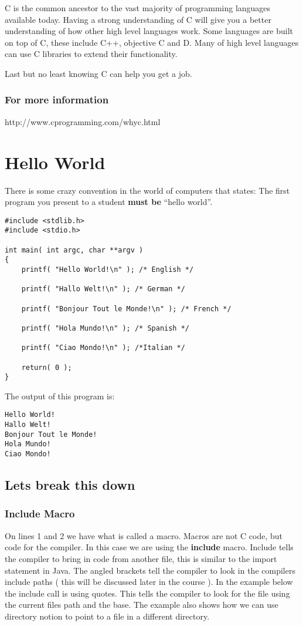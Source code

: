 \documentclass[10pt,a4paper]{paper}
\begin{document}
C is the common ancestor to the vast majority of programming languages available today.  Having a strong understanding of C will give you a better understanding of how other high level languages work.  Some languages are built on top of C, these include C++,  objective C and D.  Many of high level languages can use C libraries to extend their functionality.

Last but no least knowing C  can help you get a job. 

\subsubsection*{For more information}
http://www.cprogramming.com/whyc.html

\section{Hello World}

There is some crazy convention in the world of computers that states: The first program you present to a student \textbf{must be} ``hello world''. 

\begin{lstlisting}
#include <stdlib.h>
#include <stdio.h>

int main( int argc, char **argv )
{
	printf( "Hello World!\n" ); /* English */
	
	printf( "Hallo Welt!\n" ); /* German */
	
	printf( "Bonjour Tout le Monde!\n" ); /* French */
	
	printf( "Hola Mundo!\n" ); /* Spanish */
	
	printf( "Ciao Mondo!\n" ); /*Italian */
		
	return( 0 );
}
\end{lstlisting}

The output of this program is:
\begin{verbatim}
Hello World!
Hallo Welt!
Bonjour Tout le Monde!
Hola Mundo!
Ciao Mondo!
\end{verbatim}

\subsection*{Lets break this down}

\subsubsection*{Include Macro}
On lines 1 and 2 we have what is called a macro.  Macros are not C code, but code for the compiler.  In this case we are using the \textbf{include} macro.  Include tells the compiler to bring in code from another file, this is similar to the import statement in Java.  The angled brackets tell the compiler to look in the compilers include paths ( this will be discussed later in the course ).  In the example below the include call is using quotes.  This tells the compiler to look for the file using the current files path and the base.  The example also shows how we can use directory notion to point to a file in a different directory.
\end{document}
